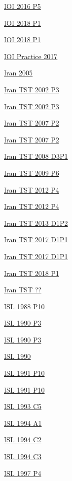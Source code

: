 \hyperref  [problem:IOI 2016 P5]{IOI 2016 P5}

\hyperref  [problem:IOI 2018 P1]{IOI 2018 P1}

\hyperref  [problem:IOI 2018 P1]{IOI 2018 P1}

\hyperref  [problem:IOI Practice 2017]{IOI Practice 2017}

\hyperref  [problem:Iran 2005]{Iran 2005}

\hyperref  [problem:Iran TST 2002 P3]{Iran TST 2002 P3}

\hyperref  [problem:Iran TST 2002 P3]{Iran TST 2002 P3}

\hyperref  [problem:Iran TST 2007 P2]{Iran TST 2007 P2}

\hyperref  [problem:Iran TST 2007 P2]{Iran TST 2007 P2}

\hyperref  [problem:Iran TST 2008 D3P1]{Iran TST 2008 D3P1}

\hyperref  [problem:Iran TST 2009 P6]{Iran TST 2009 P6}

\hyperref  [problem:Iran TST 2012 P4]{Iran TST 2012 P4}

\hyperref  [problem:Iran TST 2012 P4]{Iran TST 2012 P4}

\hyperref  [problem:Iran TST 2013 D1P2]{Iran TST 2013 D1P2}

\hyperref  [problem:Iran TST 2017 D1P1]{Iran TST 2017 D1P1}

\hyperref  [problem:Iran TST 2017 D1P1]{Iran TST 2017 D1P1}

\hyperref  [problem:Iran TST 2018 P1]{Iran TST 2018 P1}

\hyperref  [problem:Iran TST ??]{Iran TST ??}

\hyperref  [problem:ISL 1988 P10]{ISL 1988 P10}

\hyperref  [problem:ISL 1990 P3]{ISL 1990 P3}

\hyperref  [problem:ISL 1990 P3]{ISL 1990 P3}

\hyperref  [problem:ISL 1990]{ISL 1990}

\hyperref  [problem:ISL 1991 P10]{ISL 1991 P10}

\hyperref  [problem:ISL 1991 P10]{ISL 1991 P10}

\hyperref  [problem:ISL 1993 C5]{ISL 1993 C5}

\hyperref  [problem:ISL 1994 A1]{ISL 1994 A1}

\hyperref  [problem:ISL 1994 C2]{ISL 1994 C2}

\hyperref  [problem:ISL 1994 C3]{ISL 1994 C3}

\hyperref  [problem:ISL 1997 P4]{ISL 1997 P4}

